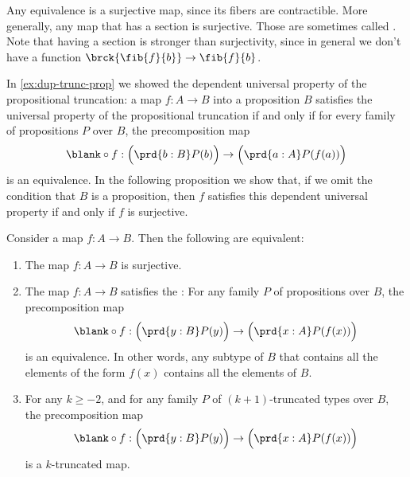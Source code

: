 \begin{eg}
  Any equivalence is a surjective map, since its fibers are contractible. More generally, any map that has a section is surjective. Those are sometimes called . Note that having a section is stronger than surjectivity, since in general we don't have a function $\brck{\fib{f}{b}}\to\fib{f}{b}$.
\end{eg}

In \cref{ex:dup-trunc-prop} we showed the dependent universal property of the propositional truncation: a map $f:A\to B$ into a proposition $B$ satisfies the universal property of the propositional truncation if and only if for every family of propositions $P$ over $B$, the precomposition map
\begin{equation*}
  \blank\circ f : \Big(\prd{b:B}P(b)\Big)\to\Big(\prd{a:A}P(f(a))\Big)
\end{equation*}
is an equivalence. In the following proposition we show that, if we omit the condition that $B$ is a proposition, then $f$ satisfies this dependent universal property if and only if $f$ is surjective.

\begin{prp}\label{prp:surjective}
  Consider a map $f:A\to B$. Then the following are equivalent:
  \begin{enumerate}
  \item \label{prp-item:surjective}The map $f:A\to B$ is surjective.
  \item \label{prp-item:is-equiv-precomp-surjective}The map $f:A\to B$ satisfies the : For any family $P$ of propositions over $B$, the precomposition map
    \begin{equation*}
      \blank\circ f : \Big(\prd{y:B}P(y)\Big)\to\Big(\prd{x:A}P(f(x))\Big)
    \end{equation*}
    is an equivalence. In other words, any subtype of $B$ that contains all the elements of the form $f(x)$ contains all the elements of $B$.
  \item \label{prp-item:is-trunc-map-precomp-surjective}For any $k\geq-2$, and for any family $P$ of $(k+1)$-truncated types over $B$, the precomposition map
    \begin{equation*}
      \blank\circ f : \Big(\prd{y:B}P(y)\Big)\to\Big(\prd{x:A}P(f(x))\Big)
    \end{equation*}
    is a $k$-truncated map.
  \end{enumerate}
\end{prp}

